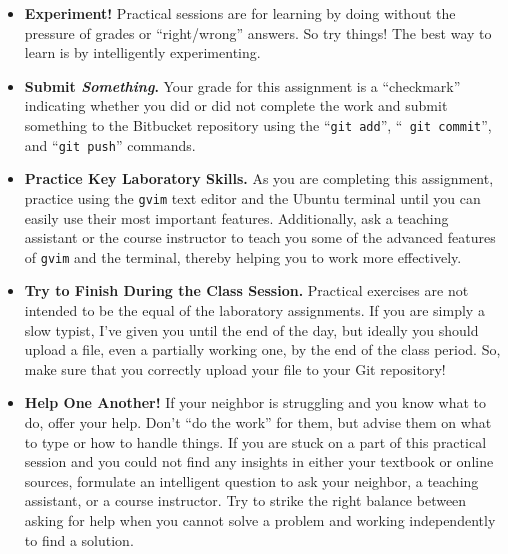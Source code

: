 \vspace*{-.05in}
\begin{itemize}

\itemsep 0in

\item {\bf Experiment!} Practical sessions are for learning by doing without the pressure of grades or ``right/wrong''
  answers. So try things!  The best way to learn is by intelligently experimenting.

\item {\bf Submit \textbf{\textit{Something}}.} Your grade for this assignment is a ``checkmark'' indicating whether you
  did or did not complete the work and submit something to the Bitbucket repository using the ``{\tt git add}'', ``{\tt
    git commit}'', and ``{\tt git push}'' commands.

\item {\bf Practice Key Laboratory Skills.} As you are completing this assignment, practice using the {\tt gvim} text
  editor and the Ubuntu terminal until you can easily use their most important features.  Additionally, ask
  a teaching assistant or the course instructor to teach you some of the advanced features of {\tt gvim} and the
  terminal, thereby helping you to work more effectively.

\item {\bf Try to Finish During the Class Session.} Practical exercises are not intended to be the equal of the
  laboratory assignments. If you are simply a slow typist, I've given you until the end of the day, but ideally you
  should upload a file, even a partially working one, by the end of the class period. So, make sure that you correctly
  upload your file to your Git repository!


\item {\bf Help One Another!} If your neighbor is struggling and you know what to do, offer your help. Don't ``do the
  work'' for them, but advise them on what to type or how to handle things. If you are stuck on a part of this practical
  session and you could not find any insights in either your textbook or online sources, formulate an intelligent
  question to ask your neighbor, a teaching assistant, or a course instructor. Try to strike the right balance between
  asking for help when you cannot solve a problem and working independently to find a solution.


\end{itemize}
